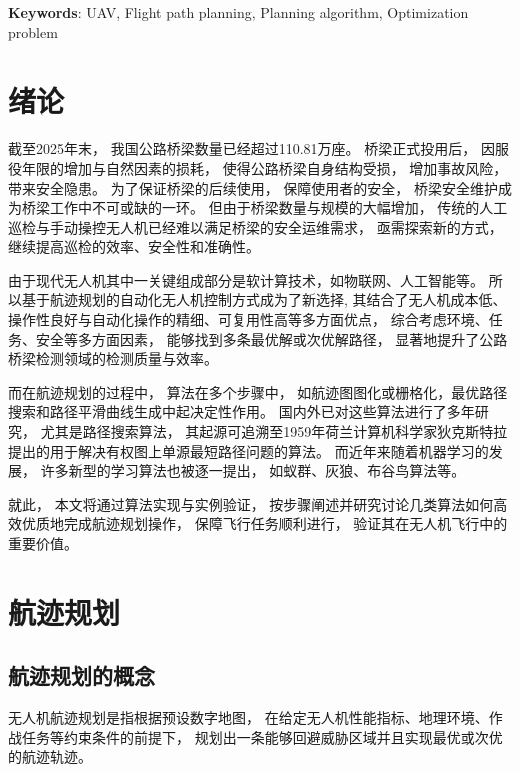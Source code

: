 \documentclass[12pt,a4paper,oneside,UTF8]{ctexart}
\newcommand\enkeywords[1]{\par\noindent\textbf{Keywords}: #1}
\begin{document}
\enkeywords{UAV, Flight path planning, Planning algorithm, Optimization problem}
\newpage\pagestyle{plain}
\tableofcontents

\newpage\setcounter{page}{1}\section{绪论}
截至2025年末，
我国公路桥梁数量已经超过110.81万座\textsuperscript{\cite{ref1}}。
桥梁正式投用后，
因服役年限的增加与自然因素的损耗，
使得公路桥梁自身结构受损，
增加事故风险，
带来安全隐患。
为了保证桥梁的后续使用，
保障使用者的安全，
桥梁安全维护成为桥梁工作中不可或缺的一环。
但由于桥梁数量与规模的大幅增加，
传统的人工巡检与手动操控无人机已经难以满足桥梁的安全运维需求，
亟需探索新的方式，继续提高巡检的效率、安全性和准确性\textsuperscript{\cite{ref2}}。

由于现代无人机其中一关键组成部分是软计算技术，如物联网、人工智能等\textsuperscript{\cite{addref1}}。
所以基于航迹规划的自动化无人机控制方式成为了新选择,
其结合了无人机成本低、操作性良好与自动化操作的精细、可复用性高等多方面优点，
综合考虑环境、任务、安全等多方面因素，
能够找到多条最优解或次优解路径，
显著地提升了公路桥梁检测领域的检测质量与效率。

而在航迹规划的过程中，
算法在多个步骤中，
如航迹图图化或栅格化，最优路径搜索和路径平滑曲线生成中起决定性作用。
国内外已对这些算法进行了多年研究，
尤其是路径搜索算法，
其起源可追溯至1959年荷兰计算机科学家狄克斯特拉提出的用于解决有权图上单源最短路径问题的算法。
而近年来随着机器学习的发展，
许多新型的学习算法也被逐一提出，
如蚁群、灰狼、布谷鸟算法等。

就此，
本文将通过算法实现与实例验证，
按步骤阐述并研究讨论几类算法如何高效优质地完成航迹规划操作，
保障飞行任务顺利进行，
验证其在无人机飞行中的重要价值。
\newpage\section{航迹规划}

\subsection{航迹规划的概念}
无人机航迹规划是指根据预设数字地图，
在给定无人机性能指标、地理环境、作战任务等约束条件的前提下，
规划出一条能够回避威胁区域并且实现最优或次优的航迹轨迹。
\end{document}
